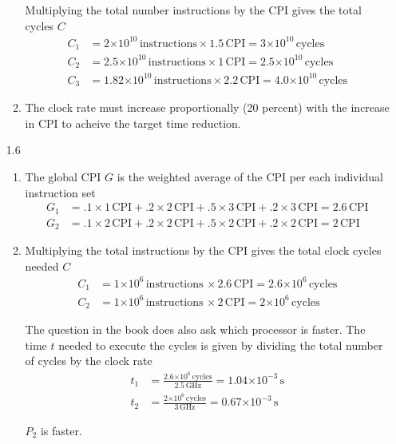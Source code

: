 \documentclass[12pt]{article}
\newcommand{\e}[1]{\ensuremath{\times 10^{#1}}}
\newcommand{\un}[1]{\ensuremath{\, \mathrm{#1}}}
\begin{document}
\begin{itemize}
\begin{enumerate}
			Multiplying the total number instructions by the CPI gives the total cycles $C$
			\begin{align*}
				C_1 &= 2\e{10}\un{instructions} \times 1.5\un{CPI} = 3\e{10}\un{cycles}\\
				C_2 &= 2.5\e{10}\un{instructions} \times 1\un{CPI} = 2.5\e{10}\un{cycles}\\
				C_3 &= 1.82\e{10}\un{instructions} \times 2.2\un{CPI} = 4.0\e{10}\un{cycles}
			\end{align*}
		\item The clock rate must increase proportionally (20 percent) with the increase in CPI to acheive the target time reduction.

		\end{enumerate}

	\item [1.6]
	\begin{enumerate}
		\item The global CPI $G$ is the weighted average of the CPI per each individual instruction set
			\begin{align*}
				G_1 &= .1 \times 1\un{CPI} + .2 \times 2\un{CPI} + .5 \times 3\un{CPI} + .2 \times 3\un{CPI} = 2.6 \un{CPI}\\
				G_2 &= .1 \times 2\un{CPI} + .2 \times 2\un{CPI} + .5 \times 2\un{CPI} + .2 \times 2\un{CPI} = 2 \un{CPI} 
			\end{align*}
		\item Multiplying the total instructions by the CPI gives the total clock cycles needed $C$
			\begin{align*}
				C_1 &= 1\e{6}\un{instructions}\, \times  2.6 \un{CPI} = 2.6\e{6}\un{cycles} \\
				C_2 &= 1\e{6}\un{instructions}\, \times  2 \un{CPI}  = 2\e{6}\un{cycles}
			\end{align*}

			The question in the book does also ask which processor is faster. The time $t$ needed to execute the cycles is given by dividing the total number of cycles by the clock rate
			\begin{align*}
				t_1 &= \frac{2.6\e{6}\un{cycles}}{2.5 \un{GHz}} = 1.04\e{-3}\un{s}  \\
				t_2 &= \frac{2\e{6}\un{cycles}}{3 \un{GHz}} = 0.67\e{-3}\un{s}
			\end{align*}

			$P_2$ is faster.
	\end{enumerate}
	


		



\end{itemize}
\end{document}
